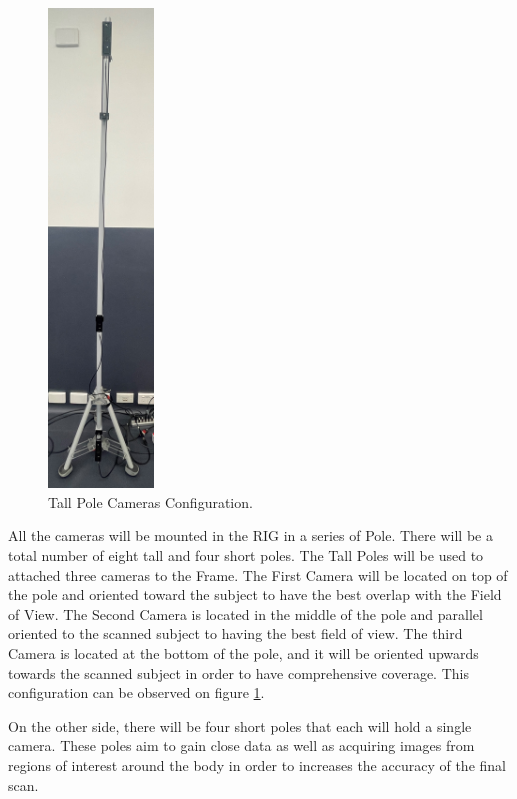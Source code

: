 \documentclass[12pt]{report}
\begin{document}
\begin{figure}
  \begin{center}
    \includegraphics[width=0.25\textwidth]{IMG_5895_cropped.jpg}
  \end{center}
  \caption{Tall Pole Cameras Configuration.}
  \label{fig:poles_camera_tall}
\end{figure}
All the cameras will be mounted in the RIG in a series of Pole. There will be a total number of eight tall and four short poles.
The Tall Poles will be used to attached three cameras to the Frame. The First Camera will be located on top of the pole and oriented toward the subject to have the best overlap with the Field of View.
The Second Camera is located in the middle of the pole and parallel oriented to the scanned subject to having the best field of view. 
The third Camera is located at the bottom of the pole, and it will be oriented upwards towards the scanned subject in order to have comprehensive coverage. 
This configuration can be observed on figure \ref{fig:poles_camera_tall}.

On the other side, there will be four short poles that each will hold a single camera. 
These poles aim to gain close data as well as acquiring images from regions of interest around the body in order to increases
the accuracy of the final scan. 
\end{document}
